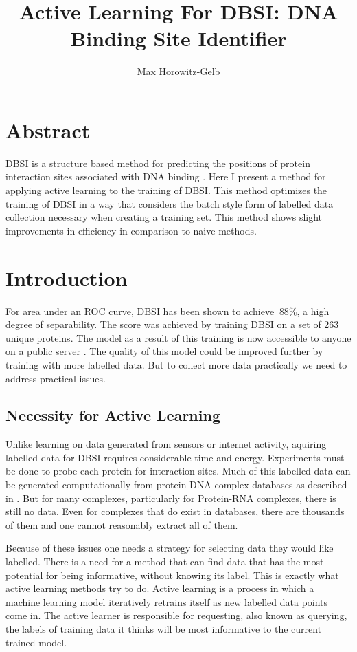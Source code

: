 \documentclass{article}
\begin{document}
\author{Max Horowitz-Gelb}
\title{Active Learning For DBSI: DNA Binding Site Identifier }
\maketitle

\section*{Abstract}
DBSI is a structure based method for predicting the positions of protein interaction sites associated with DNA binding \cite{dbsi}. Here I present a method for applying active learning to the training of DBSI. This method optimizes the training of DBSI in a way that considers the batch style form of labelled data collection necessary when creating a training set. This method shows slight improvements in efficiency in comparison to naive methods. 
\section*{Introduction}
For area under an ROC curve, DBSI has been shown to achieve $~88\%$, a high degree of separability. The score was achieved by training DBSI on a set of 263 unique proteins. The model as a result of this training is now accessible to anyone on a public server \cite{dbsi_server}. The quality of this model could be improved further by training with more labelled data. But to collect more data practically we need to address practical issues.
\subsection*{Necessity for Active Learning}
Unlike learning on data generated from sensors or internet activity, aquiring labelled data for DBSI requires considerable time and energy. Experiments must be done to probe each protein for interaction sites. Much of this labelled data can be generated computationally from protein-DNA complex databases as described in \cite{displar}.
But for many complexes, particularly for Protein-RNA complexes, there is still no data. Even for complexes that do exist in databases, there are thousands of them and one cannot reasonably extract all of them. 

Because of these issues one needs a strategy for selecting data they would like labelled. There is a need for a method that can find data that has the most potential for being informative, without knowing its label. This is exactly what active learning methods try to do. Active learning is a process in which a machine learning model iteratively retrains itself as new labelled data points come in. The active learner is responsible for requesting, also known as querying, the labels of training data it thinks will be most informative to the current trained model.  
\end{document}

